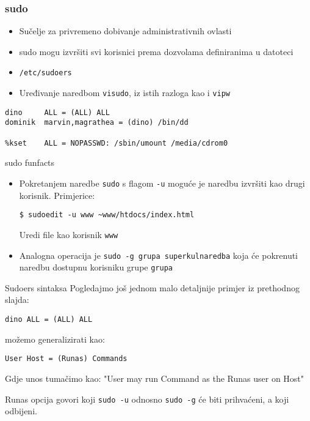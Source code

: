 \documentclass[table,usenames,dvipsnames] {beamer}
\newcommand{\shell}[1]{\texttt{#1}}
\begin{document}
\begin{frame}[fragile]
\frametitle{sudo}
\begin{itemize}
  \item Sučelje za privremeno dobivanje administrativnih ovlasti
  \item sudo mogu izvršiti svi korisnici prema dozvolama definiranima u datoteci
  \item[] {\small\shell{/etc/sudoers}}
  \item Uređivanje naredbom \shell{visudo}, iz istih razloga kao i \shell{vipw}
\end{itemize}
\vfill
\footnotesize
\begin{Verbatim}
dino     ALL = (ALL) ALL
dominik  marvin,magrathea = (dino) /bin/dd

%kset    ALL = NOPASSWD: /sbin/umount /media/cdrom0
\end{Verbatim}
\end{frame}

\begin{frame} {sudo funfacts}

\begin{itemize}
\item Pokretanjem naredbe \shell{sudo} s flagom \shell{-u} moguće je naredbu izvršiti kao drugi korisnik. Primjerice: 

\shell{\$ sudoedit -u www \textasciitilde www/htdocs/index.html}

Uredi file kao korisnik \shell{www}

\item Analogna operacija je \shell{sudo -g grupa superkulnaredba} koja će pokrenuti naredbu dostupnu korisniku grupe \shell{grupa} 
\end{itemize}

\end{frame}


\begin{frame}{Sudoers sintaksa}
Pogledajmo još jednom malo detaljnije primjer iz prethodnog slajda:

\shell{dino ALL = (ALL) ALL} 

možemo generalizirati kao:

\shell{User Host = (Runas) Commands}

Gdje unos tumačimo kao: "User may run Command as the Runas user on Host"

Runas opcija govori koji \shell{sudo -u} odnosno \shell{sudo -g} će biti prihvaćeni, a koji odbijeni. 


\end{frame}
\end{document}
